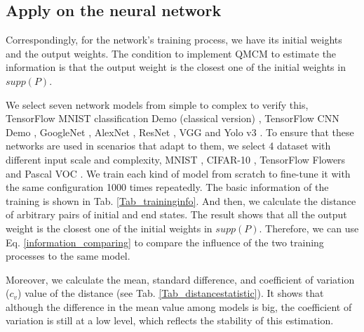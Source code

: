 \documentclass[letterpaper]{article} %
\begin{document}
\subsection{Apply on the neural network}
Correspondingly, for the network's training process, we have its initial weights and the output weights. The condition to implement QMCM to estimate the information is that the output weight is the closest one of the initial weights in $supp(P)$.

We select seven network models from simple to complex to verify this, TensorFlow MNIST classification Demo (classical version) \cite{TensorFlowMNIST}, TensorFlow CNN Demo \cite{TensorflowDemo}, GoogleNet \cite{szegedy2015going}, AlexNet \cite{krizhevsky2017imagenet}, ResNet \cite{he2016deep}, VGG \cite{simonyan2014very} and Yolo v3 \cite{redmon2018yolov3}. To ensure that these networks are used in scenarios that adapt to them, we select 4 dataset with different input scale and complexity, MNIST \cite{lecun1998gradient}, CIFAR-10 \cite{Krizhevsky09learningmultiple}, TensorFlow Flowers \cite{tfflowers} and Pascal VOC \cite{pascal-voc-2007}. We train each kind of model from scratch to fine-tune it with the same configuration 1000 times repeatedly. The basic information of the training is shown in Tab. \ref{Tab_traininginfo}. And then, we calculate the distance of arbitrary pairs of initial and end states. The result shows that all the output weight is the closest one of the initial weights in $supp(P)$. Therefore, we can use Eq. \ref{information_comparing} to compare the influence of the two training processes to the same model.

Moreover, we calculate the mean, standard difference, and coefficient of variation ($c_v$) value of the distance (see Tab. \ref{Tab_distancestatistic}). It shows that although the difference in the mean value among models is big, the coefficient of variation is still at a low level, which reflects the stability of this estimation.
\end{document}
